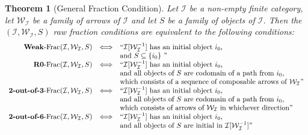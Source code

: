\documentclass{article}
\numberwithin{equation}{section}
\theoremstyle{definition}
\theoremstyle{plain}
\newtheorem{theorem}[equation]{Theorem}
\begin{document}
\begin{theorem}[General Fraction Condition] 
	Let $\mathcal{I}$ be a non-empty finite category, let $\mathcal{W}_{\mathcal{I}}$ be a family of arrows of $\mathcal{I}$ and let $S$ be a family of objects of $\mathcal{I}$. Then the $(\mathcal{I}, \mathcal{W}_{\mathcal{I}}, S)$ raw fraction conditions are equivalent to the following conditions:
	\[\begin{array}{rcl}
		\textnormal{\textbf{Weak}-Frac}(\mathcal{I}, \mathcal{W}_{\mathcal{I}}, S) & \Longleftrightarrow & \text{``$\mathcal{I}[\mathcal{W}_{\mathcal{I}}^{-1}]$ has an initial object $i_0$,}  \\
		&& \text{and $S \subseteq \{i_0\}$ ''}\\
		
		\textnormal{\textbf{R0}-Frac}(\mathcal{I}, \mathcal{W}_{\mathcal{I}}, S) & \Longleftrightarrow & \text{``$\mathcal{I}[\mathcal{W}_{\mathcal{I}}^{-1}]$ has an initial object $i_0$,}  \\
		&& \text{and all objects of $S$ are codomain of a path from $i_0$,}\\
		&& \text{which consists of a sequence of composable arrows of $\mathcal{W}_{\mathcal{I}}$''}\\
		
		\textnormal{\textbf{2-out-of-3}-Frac}(\mathcal{I}, \mathcal{W}_{\mathcal{I}}, S) & \Longleftrightarrow & \text{``$\mathcal{I}[\mathcal{W}_{\mathcal{I}}^{-1}]$ has an initial object $i_0$,}  \\
		&& \text{and all objects of $S$ are codomain of a path from $i_0$,}\\
		&& \text{which consists of arrows of $\mathcal{W}_{\mathcal{I}}$ in whichever direction''}\\
		
		\textnormal{\textbf{2-out-of-6}-Frac}(\mathcal{I}, \mathcal{W}_{\mathcal{I}}, S) & \Longleftrightarrow & \text{``$\mathcal{I}[\mathcal{W}_{\mathcal{I}}^{-1}]$ has an initial object $i_0$,}  \\
		&& \text{and all objects of $S$ are initial in $\mathcal{I}[\mathcal{W}_{\mathcal{I}}^{-1}]$''}
	\end{array}\]
\end{theorem}
\end{document}
